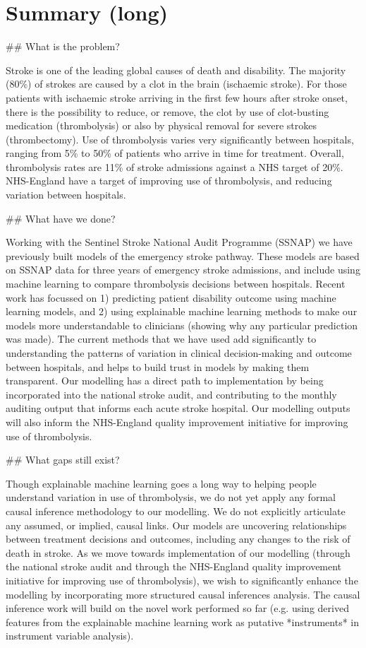 \section{Summary (long)}
\begin{markdown}

## What is the problem?

Stroke is one of the leading global causes of death and disability. The majority (80\%) of strokes are caused by a clot in the brain (ischaemic stroke). For those patients with ischaemic stroke arriving in the first few hours after stroke onset, there is the possibility to reduce, or remove, the clot by use of clot-busting medication (thrombolysis) or also by physical removal for severe strokes (thrombectomy). Use of thrombolysis varies very significantly between hospitals, ranging from 5\% to 50\% of patients who arrive in time for treatment. Overall, thrombolysis rates are 11\% of stroke admissions against a NHS target of 20\%. NHS-England have a target of improving use of thrombolysis, and reducing variation between hospitals.

## What have we done?

Working with the Sentinel Stroke National Audit Programme (SSNAP) we have previously built models of the emergency stroke pathway. These models are based on SSNAP data for three years of emergency stroke admissions, and include using machine learning to compare thrombolysis decisions between hospitals. Recent work has focussed on 1) predicting patient disability outcome using machine learning models, and 2) using explainable machine learning methods to make our models more understandable to clinicians (showing why any particular prediction was made). The current methods that we have used add significantly to understanding the patterns of variation in clinical decision-making and outcome between hospitals, and helps to build trust in models by making them transparent. Our modelling has a direct path to implementation by being incorporated into the national stroke audit, and contributing to the monthly auditing output that informs each acute stroke hospital. Our modelling outputs will also inform the NHS-England quality improvement initiative for improving use of thrombolysis.

## What gaps still exist?

Though explainable machine learning goes a long way to helping people understand variation in use of thrombolysis, we do not yet apply any formal causal inference methodology to our modelling. We do not explicitly articulate any assumed, or implied, causal links. Our models are uncovering relationships between treatment decisions and outcomes, including any changes to the risk of death in stroke. As we move towards implementation of our modelling (through the national stroke audit and through the NHS-England quality improvement initiative for improving use of thrombolysis), we wish to significantly enhance the modelling by incorporating more structured causal inferences analysis. The causal inference work will build on the novel work performed so far (e.g. using derived features from the explainable machine learning work as putative *instruments* in instrument variable analysis).


\end{markdown}
